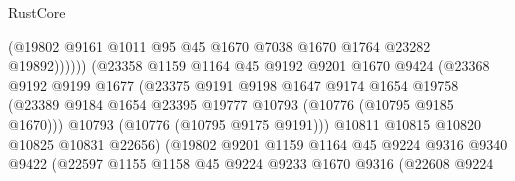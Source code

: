 \begin{lexlean}{RustCore}
\begin{coremodule}
                                      (@19802
                                        @9161
                                        @1011
                                        @95
                                        @45
                                        @1670
                                        @7038
                                        @1670
                                        @1764
                                        @23282
                                        @19892))))))
                            (@23358
                              @1159
                              @1164
                              @45
                              @9192
                              @9201
                              @1670
                              @9424
                              (@23368
                                @9192
                                @9199
                                @1677
                                (@23375
                                  @9191
                                  @9198
                                  @1647
                                  @9174
                                  @1654
                                  @19758
                                  (@23389
                                    @9184
                                    @1654
                                    @23395
                                    @19777
                                    @10793
                                    (@10776 (@10795 @9185 @1670)))
                                  @10793
                                  (@10776 (@10795 @9175 @9191)))
                                @10811
                                @10815
                                @10820
                                @10825
                                @10831
                                @22656)
                              (@19802
                                @9201
                                @1159
                                @1164
                                @45
                                @9224
                                @9316
                                @9340
                                @9422
                                (@22597
                                  @1155
                                  @1158
                                  @45
                                  @9224
                                  @9233
                                  @1670
                                  @9316
                                  (@22608
                                    @9224

\end{coremodule}
\end{lexlean}
